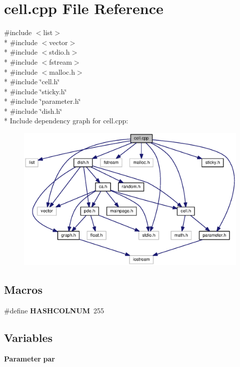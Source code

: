 \section{cell.\-cpp File Reference}
\label{cell_8cpp}
{\ttfamily \#include $<$list$>$}\\*
{\ttfamily \#include $<$vector$>$}\\*
{\ttfamily \#include $<$stdio.\-h$>$}\\*
{\ttfamily \#include $<$fstream$>$}\\*
{\ttfamily \#include $<$malloc.\-h$>$}\\*
{\ttfamily \#include \char`\"{}cell.\-h\char`\"{}}\\*
{\ttfamily \#include \char`\"{}sticky.\-h\char`\"{}}\\*
{\ttfamily \#include \char`\"{}parameter.\-h\char`\"{}}\\*
{\ttfamily \#include \char`\"{}dish.\-h\char`\"{}}\\*
Include dependency graph for cell.\-cpp\-:
\nopagebreak
\begin{figure}[H]
\begin{center}
\leavevmode
\includegraphics[width=350pt]{cell_8cpp__incl}
\end{center}
\end{figure}
\subsection*{Macros}
\begin{DoxyCompactItemize}
\item 
\#define {\bf H\-A\-S\-H\-C\-O\-L\-N\-U\-M}~255
\end{DoxyCompactItemize}
\subsection*{Variables}
\begin{DoxyCompactItemize}
\item 
{\bf Parameter} {\bf par}
\end{DoxyCompactItemize}


